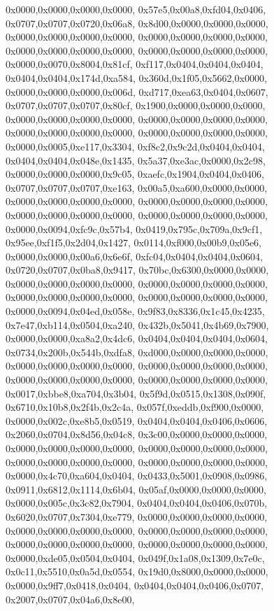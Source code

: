 {	0x0000,0x0000,0x0000,0x0000,
	0x57e5,0x00a8,0xfd04,0x0406,
	0x0707,0x0707,0x0720,0x06a8,
	0x8d00,0x0000,0x0000,0x0000,
	0x0000,0x0000,0x0000,0x0000,
	0x0000,0x0000,0x0000,0x0000,
	0x0000,0x0000,0x0000,0x0000,
	0x0000,0x0000,0x0000,0x0000,
	0x0000,0x0070,0x8004,0x81cf,
	0xf117,0x0404,0x0404,0x0404,
	0x0404,0x0404,0x174d,0xa584,
	0x360d,0x1f05,0x5662,0x0000,
	0x0000,0x0000,0x0000,0x006d,
	0xd717,0xea63,0x0404,0x0607,
	0x0707,0x0707,0x0707,0x80cf,
	0x1900,0x0000,0x0000,0x0000,
	0x0000,0x0000,0x0000,0x0000,
	0x0000,0x0000,0x0000,0x0000,
	0x0000,0x0000,0x0000,0x0000,
	0x0000,0x0000,0x0000,0x0000,
	0x0000,0x0005,0xe117,0x3304,
	0xf8c2,0x9c2d,0x0404,0x0404,
	0x0404,0x0404,0x048e,0x1435,
	0x5a37,0xe3ac,0x0000,0x2c98,
	0x0000,0x0000,0x0000,0x9c05,
	0xaefc,0x1904,0x0404,0x0406,
	0x0707,0x0707,0x0707,0xe163,
	0x00a5,0xa600,0x0000,0x0000,
	0x0000,0x0000,0x0000,0x0000,
	0x0000,0x0000,0x0000,0x0000,
	0x0000,0x0000,0x0000,0x0000,
	0x0000,0x0000,0x0000,0x0000,
	0x0000,0x0094,0xfc9c,0x57b4,
	0x0419,0x795c,0x709a,0x9cf1,
	0x95ee,0xf1f5,0x2d04,0x1427,
	0x0114,0xf000,0x00b9,0x05e6,
	0x0000,0x0000,0x00a6,0x6e6f,
	0xfc04,0x0404,0x0404,0x0604,
	0x0720,0x0707,0x0ba8,0x9417,
	0x70bc,0x6300,0x0000,0x0000,
	0x0000,0x0000,0x0000,0x0000,
	0x0000,0x0000,0x0000,0x0000,
	0x0000,0x0000,0x0000,0x0000,
	0x0000,0x0000,0x0000,0x0000,
	0x0000,0x0094,0x04ed,0x058e,
	0x9f83,0x8336,0x1c45,0x4235,
	0x7e47,0xb114,0x0504,0xa240,
	0x432b,0x5041,0x4b69,0x7900,
	0x0000,0x0000,0xa8a2,0x4dc6,
	0x0404,0x0404,0x0404,0x0604,
	0x0734,0x200b,0x544b,0xdfa8,
	0xd000,0x0000,0x0000,0x0000,
	0x0000,0x0000,0x0000,0x0000,
	0x0000,0x0000,0x0000,0x0000,
	0x0000,0x0000,0x0000,0x0000,
	0x0000,0x0000,0x0000,0x0000,
	0x0017,0xbbe8,0xa704,0x3b04,
	0x5f9d,0x0515,0x1308,0x090f,
	0x6710,0x10b8,0x2f4b,0x2c4a,
	0x057f,0xeddb,0xf900,0x0000,
	0x0000,0x002c,0xe8b5,0x0519,
	0x0404,0x0404,0x0406,0x0606,
	0x2060,0x0704,0x8d56,0x04c8,
	0x3c00,0x0000,0x0000,0x0000,
	0x0000,0x0000,0x0000,0x0000,
	0x0000,0x0000,0x0000,0x0000,
	0x0000,0x0000,0x0000,0x0000,
	0x0000,0x0000,0x0000,0x0000,
	0x0000,0x4c70,0xa604,0x0404,
	0x0433,0x5001,0x0908,0x0986,
	0x0911,0x6812,0x1114,0x6b04,
	0x05af,0x0000,0x0000,0x0000,
	0x0000,0x005c,0x3c82,0x7904,
	0x0404,0x0404,0x0406,0x070b,
	0x6020,0x0707,0x7304,0xe779,
	0x0000,0x0000,0x0000,0x0000,
	0x0000,0x0000,0x0000,0x0000,
	0x0000,0x0000,0x0000,0x0000,
	0x0000,0x0000,0x0000,0x0000,
	0x0000,0x0000,0x0000,0x0000,
	0x0000,0xde05,0x0504,0x0404,
	0x049f,0x1a08,0x1309,0x7e0c,
	0x0c11,0x5510,0x0a5d,0x0554,
	0x19d0,0x8000,0x0000,0x0000,
	0x0000,0x9ff7,0x0418,0x0404,
	0x0404,0x0404,0x0406,0x0707,
	0x2007,0x0707,0x04a6,0x8e00,
}
